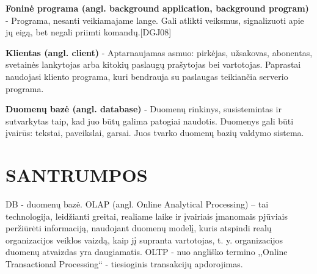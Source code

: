 \documentclass[12pt,a4paper,titlepage]{article}
\begin{document}
\textbf{Foninė programa (angl. background application, background program)} - Programa, nesanti veikiamajame lange.
Gali atlikti veiksmus, signalizuoti apie jų eigą, bet negali priimti komandų.[DGJ08]

\textbf{Klientas (angl. client)} - Aptarnaujamas asmuo: pirkėjas, užsakovas, abonentas, svetainės lankytojas arba kitokių paslaugų prašytojas bei vartotojas. Paprastai naudojasi kliento programa, kuri bendrauja su paslaugas teikiančia serverio programa.

\textbf{Duomenų bazė (angl. database)} - Duomenų rinkinys, susistemintas ir sutvarkytas taip, kad juo būtų galima patogiai naudotis. Duomenys gali būti įvairūs: tekstai, paveikslai, garsai. Juos tvarko duomenų bazių valdymo sistema.

\section*{SANTRUMPOS}
DB - duomenų bazė.
OLAP (angl. Online Analytical Processing) – tai technologija, leidžianti greitai, realiame laike ir įvairiais įmanomais pjūviais peržiūrėti informaciją, naudojant duomenų modelį, kuris atspindi realų organizacijos veiklos vaizdą, kaip jį supranta vartotojas, t. y. organizacijos duomenų atvaizdas yra daugiamatis.
OLTP - nuo angliško termino ,,Online Transactional Processing`` - tiesioginis transakcijų apdorojimas.
\end{document}

